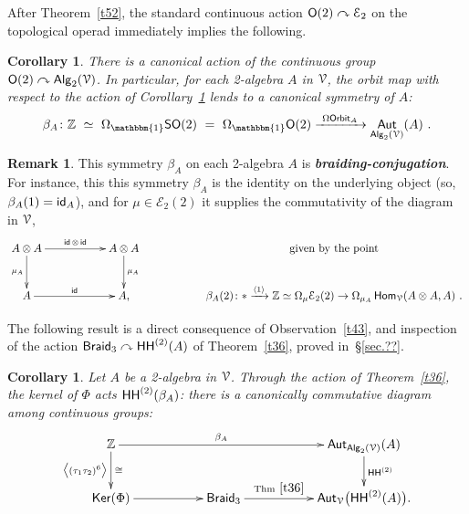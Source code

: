 \documentclass{amsart}
\newtheorem{cor}[theorem]{Corollary}
\theoremstyle{definition}
\newtheorem{remark}[theorem]{Remark}
\theoremstyle{remark}
\DeclareMathOperator{\Alg}{\sf Alg}
\DeclareMathOperator{\Aut}{\sf Aut}
\DeclareMathOperator{\Hom}{\sf Hom}
\DeclareMathOperator{\Ker}{\sf Ker}
\newcommand{\bit}[1]{\textbf{\textit{#1}}}
\newcommand{\lacts}{\curvearrowright}
\def\ot{\otimes}
\newcommand{\lag}{\langle}
\newcommand{\rag}{\rangle}
\newcommand{\xra}{\xrightarrow}
\def\cE{\mathcal E}\def\cF{\mathcal F}\def\cG{\mathcal G}\def\cH{\mathcal H}
\DeclareMathOperator{\uno}{\mathbbm{1}}
\DeclareMathOperator{\Braid}{{\sf Braid}_3}
\DeclareMathOperator{\id}{\sf id}
\DeclareMathOperator{\HHt}{{\sf HH}^{(2)}}
\begin{document}
After Theorem~\ref{t52}, the standard continuous action $\sO(2) \lacts \cE_2$ on the topological operad immediately implies the following.  
\begin{cor}
\label{t53}
There is a canonical action of the continuous group $\sO(2) \lacts \Alg_2(\cV)$.  
In particular, for each 2-algebra $A$ in $\mathcal V$, 
the orbit map with respect to the action of Corollary~\ref{t53} lends to a canonical 
symmetry of $A$:
\[
\beta_A
\colon
\ZZ
~\simeq~
\Omega_{\uno} {\sf SO}(2)
~=~
\Omega_{\uno} \sO(2)
\xra{~\Omega {\sf Orbit}_{A}~}
\Aut_{\Alg_2(\cV)}(A)
~.
\]


\end{cor}



\begin{remark}
This symmetry $\beta_A$ on each 2-algebra $A$ is \bit{braiding-conjugation}.
For instance, this this symmetry $\beta_A$ is the identity on the underlying object (so, $\beta_A(1) = \id_A$), and for $\mu\in \cE_2(2)$ it supplies the commutativity of the diagram in $\mathcal V$,
\[
\xymatrix{
A \ot A
\ar[rr]^-{ \id \ot \id}
\ar[d]_-{\mu_A}
&&
A \ot A
\ar[d]^-{\mu_A}
&&
\text{ given by the point }
\\
A
\ar[rr]^-{\id}
&&
A
,
&&
\beta_A(2)\colon \ast \xra{\lag 1 \rag} \ZZ \simeq \Omega_{\mu} \cE_2(2) \to \Omega_{\mu_A} \Hom_{\cV}(A\ot A , A)
~.
}
\]
\end{remark}
%


The following result is a direct consequence of Observation~\ref{t43}, 
and inspection of the action $\Braid\lacts \HHt(A)$ of Theorem~\ref{t36}, proved in~\S\ref{sec.??}. 
\begin{cor}
\label{t54}
Let $A$ be a 2-algebra in $\mathcal V$.
Through the action of Theorem~\ref{t36}, the kernel of $\Phi$ acts $\HHt(\beta_A)$:
there is a canonically commutative diagram among continuous groups:
\[
\xymatrix{
\ZZ
\ar[d]^-{\cong}_-{\bigl\lag (\tau_1\tau_2)^6 \bigr\rag}
\ar[rrrr]^-{\beta_A}
&&
&&
\Aut_{\Alg_2(\cV)}(A)
\ar[d]^-{\HHt}
\\
\Ker(\Phi)
\ar[rr]
&&
\Braid
\ar[rr]^-{\rm Thm~\ref{t36}}
&&
\Aut_{\cV}\bigl(
\HHt(A)
\bigr)
.
}
\]

\end{cor}
\end{document}

